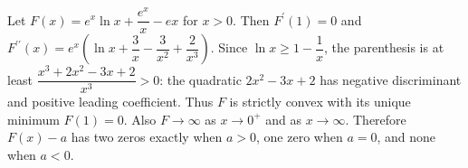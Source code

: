 Let $F (x) = e^x \ln x + \dfrac{e^x}{x} - e x$ for $x>0$. Then $F^{\prime}(1)=0$ and $F^{\prime\prime} (x) = e^x (\ln x + \dfrac{3}{x} - \dfrac{3}{x^2} + \dfrac{2}{x^3})$. Since $\ln x \ge 1 - \dfrac{1}{x}$, the parenthesis is at least $\dfrac{x^3+2x^2-3x+2}{x^3} > 0$: the quadratic $2x^2-3x+2$ has negative discriminant and positive leading coefficient. Thus $F$ is strictly convex with its unique minimum $F(1)=0$. Also $F\to\infty$ as $x\to0^+$ and as $x\to\infty$. Therefore $F(x)-a$ has two zeros exactly when $\boxed{a>0}$, one zero when $a=0$, and none when $a<0$.
